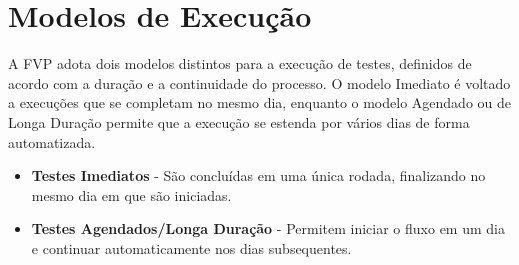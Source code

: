 \section{Modelos de Execução}

A FVP adota dois modelos distintos para a execução de testes, definidos de acordo com a duração e a continuidade do processo. O modelo Imediato é voltado a execuções que se completam no mesmo dia, enquanto o modelo Agendado ou de Longa Duração permite que a execução se estenda por vários dias de forma automatizada.

\begin{itemize}
    \item \textbf{Testes Imediatos} - São concluídas em uma única rodada, finalizando no mesmo dia em que são iniciadas.
    
    \item \textbf{Testes Agendados/Longa Duração} - Permitem iniciar o fluxo em um dia e continuar automaticamente nos dias subsequentes.
\end{itemize}

\begin{figure}[H]
    \centering
    \label{fig:imediatoxlonga}
\end{figure}

